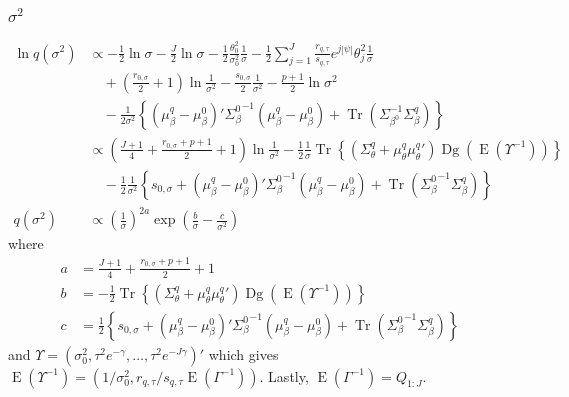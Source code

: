 \documentclass[11pt]{article}
\DeclareMathOperator{\Tr}{Tr}
\newcommand{\opn}{\operatorname}
\begin{document}
\subsubsection{$\sigma^{2}$}
  \begin{align*}
    \ln q\left(\sigma^{2}\right) &\propto -\frac{1}{2}\ln \sigma -\frac{J}{2}\ln \sigma -\frac{1}{2}\frac{\theta_{0}^{2}}{\sigma_{0}^{2}}\frac{1}{\sigma} -\frac{1}{2}\sum_{j=1}^{J}\frac{r_{q,\tau}}{s_{q,\tau}}e^{j\left|\psi\right|}\theta_{j}^{2}\frac{1}{\sigma}\\
    &\quad +\left(\frac{r_{0,\sigma}}{2}+1\right)\ln \frac{1}{\sigma^{2}} -\frac{s_{0,\sigma}}{2}\frac{1}{\sigma^{2}} -\frac{p+1}{2}\ln\sigma^{2}\\
    &\quad -\frac{1}{2\sigma^{2}}\left\{\left(\mu_{\beta}^{q}-\mu_{\beta}^{0}\right)'{\Sigma_{\beta}^{0}}^{-1}\left(\mu_{\beta}^{q}-\mu_{\beta}^{0}\right) + \Tr\left(\Sigma_{{\beta}^{0}}^{-1}\Sigma_{\beta}^{q} \right) \right\}\\
    &\propto \left(\frac{J+1}{4} +\frac{r_{0,\sigma}+p+1}{2} + 1\right)\ln \frac{1}{\sigma^{2}} -\frac{1}{2}\frac{1}{\sigma}\Tr\left\{\left(\Sigma_{\theta}^{q}+\mu_{\theta}^{q}{\mu_{\theta}^{q}}'\right)\opn{Dg}\left(\opn{E}\left(\Upsilon^{-1}\right)\right) \right\}\\
    &\quad -\frac{1}{2}\frac{1}{\sigma^{2}}\left\{s_{0,\sigma} + \left(\mu_{\beta}^{q}-\mu_{\beta}^{0}\right)'{\Sigma_{\beta}^{0}}^{-1}\left(\mu_{\beta}^{q}-\mu_{\beta}^{0}\right)  + \Tr\left({\Sigma_{\beta}^{0}}^{-1}\Sigma_{\beta}^{q}\right) \right\}\\
    q\left(\sigma^{2}\right) &\propto \left(\frac{1}{\sigma}\right)^{2a}\exp\left(\frac{b}{\sigma} -\frac{c}{\sigma^{2}}\right)
  \end{align*}
  where
  \begin{align*}
    a &= \frac{J+1}{4} + \frac{r_{0,\sigma}+p+1}{2} + 1\\
    b &= -\frac{1}{2}\Tr\left\{\left(\Sigma_{\theta}^{q}+\mu_{\theta}^{q}{\mu_{\theta}^{q}}'\right)\opn{Dg}\left(\opn{E}\left(\Upsilon^{-1}\right)\right) \right\}\\
    c &= \frac{1}{2}\left\{s_{0,\sigma} + \left(\mu_{\beta}^{q}-\mu_{\beta}^{0}\right)'{\Sigma_{\beta}^{0}}^{-1}\left(\mu_{\beta}^{q}-\mu_{\beta}^{0}\right)+\Tr\left({\Sigma_{\beta}^{0}}^{-1}\Sigma_{\beta}^{q}\right) \right\}
  \end{align*}
and $\Upsilon = \left(\sigma_{0}^{2}, \tau^{2}e^{-\gamma}, \ldots , \tau^{2}e^{-J\gamma} \right)'$ which gives $\opn{E}\left(\Upsilon^{-1}\right)=\left(1/\sigma_{0}^{2}, r_{q,\tau}/s_{q,\tau}\opn{E}\left(\Gamma^{-1}\right)\right)$. Lastly, $\opn{E}\left(\Gamma^{-1}\right)=Q_{1:J}$.
\end{document}
